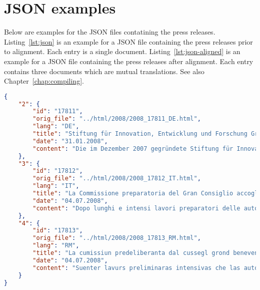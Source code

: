 \chapter{JSON examples}\label{appendix-b}
Below are examples for the \acrshort{JSON} files contatining the press releases. 
Listing~\ref{lst:json} is an example for a JSON file containing the press releases prior to alignment. 
Each entry is a single document.
Listing~\ref{lst:json-aligned} is an example for a JSON file containing the press releases after alignment. 
Each entry contains three documents which are mutual translations.
See also Chapter~\ref{chap:compiling}.


\begin{lstlisting}[caption={Example for a JSON file containing the press releases extracted from the HTML files.}, captionpos=b, label=lst:json, language=json]
{
    "2": {
        "id": "17811",
        "orig_file": "../html/2008/2008_17811_DE.html",
        "lang": "DE",
        "title": "Stiftung für Innovation, Entwicklung und Forschung Graubünden nimmt ihre Tätigkeit auf",
        "date": "31.01.2008",
        "content": "Die im Dezember 2007 gegründete Stiftung für Innovation, Entwicklung  und Forschung Graubünden hat ihre Tätigkeit im Januar 2008 aufgenommen.  ..."
    },
    "3": {
        "id": "17812",
        "orig_file": "../html/2008/2008_17812_IT.html",
        "lang": "IT",
        "title": "La Commissione preparatoria del Gran Consiglio accoglie con favore l'aggregazione dei Comuni di Feldis, Scheid, Trans e Tomils nel Comune di Tomils",
        "date": "04.07.2008",
        "content": "Dopo lunghi e intensi lavori preparatori delle autorità dei Comuni  interessati, il 13 dicembre 2007 gli aventi diritto di voto di tutti e  quattro i Comuni di Feldis/Veulden, Scheid, Trans e Tumegl/Tomils hanno  accolto a larga maggioranza la convenzione sulla nuova aggregazione nel  Comune di Tomils.  ..."
    },
    "4": {
        "id": "17813",
        "orig_file": "../html/2008/2008_17813_RM.html",
        "lang": "RM",
        "title": "La cumissiun predeliberanta dal cussegl grond beneventa la fusiun da las vischnancas da Veulden, da Sched, da Tràn e da Tumegl a la vischnanca da Tumegl",
        "date": "04.07.2008",
        "content": "Suenter lavurs preliminaras intensivas che las autoritads da las  vischnancas pertutgadas han prestà durant divers onns han las votantas  ed ils votants da tut las quatter vischnancas da Veulden, da Sched, da  Tràn e da Tumegl acceptà ils 13 da december 2007 cun gronda maioritad en  tut las vischnancas la cunvegna da fusiun a la nova vischnanca da  Tumegl.  ..."
    }
}
\end{lstlisting}

